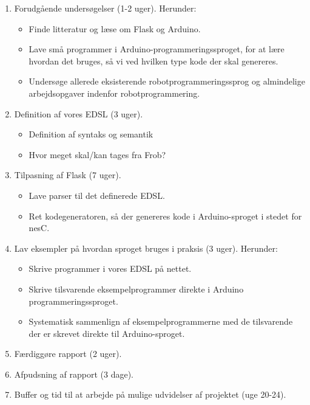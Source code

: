 \documentclass[a4paper,oneside, draft]{memoir}
\begin{document}
\begin{enumerate}

\item Forudgående undersøgelser (1-2 uger). Herunder:
  
  \begin{itemize}

  \item Finde litteratur og læse om Flask og Arduino.

  \item Lave små programmer i Arduino-programmeringssproget, for at lære hvordan
    det bruges, så vi ved hvilken type kode der skal genereres.

  \item Undersøge allerede eksisterende robotprogrammeringssprog og almindelige
    arbejdsopgaver indenfor robotprogrammering.

  \end{itemize}

\item Definition af vores EDSL (3
  uger).  \label{item:opgaver:definer-syntaks}
  \begin{itemize}
  \item Definition af syntaks og semantik
  \item Hvor meget skal/kan tages fra Frob?
  \end{itemize}


\item Tilpasning af Flask (7 uger). 
  \begin{itemize}

  \item Lave parser til det definerede EDSL.

  \item Ret kodegeneratoren, så der genereres kode i Arduino-sproget i
    stedet for nesC.

  \end{itemize}


\item Lav eksempler på hvordan sproget bruges i praksis (3 uger). Herunder:
  \label{item:opgaver:lav-eksempler}

  \begin{itemize}
  \item Skrive programmer i vores EDSL 
    på nettet.
  \item Skrive tilsvarende eksempelprogrammer direkte  i Arduino programmeringssproget.

  \item Systematisk sammenlign af eksempelprogrammerne med de
    tilsvarende der er skrevet direkte til Arduino-sproget.

  \end{itemize}
    
\item Færdiggøre rapport (2 uger).
  
\item Afpudsning af rapport (3 dage).
  
\item Buffer og tid til at arbejde på mulige udvidelser af projektet (uge 20-24).

\end{enumerate}
\end{document}
